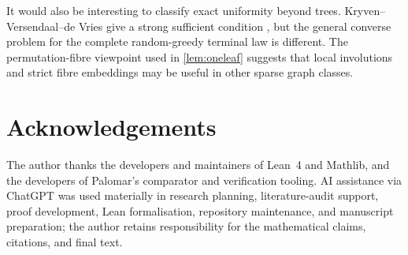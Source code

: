 \documentclass[11pt]{article}
\theoremstyle{definition}
\begin{document}
It would also be interesting to classify exact uniformity beyond trees.  Kryven--Versendaal--de Vries give a strong sufficient condition \cite{KryvenEtAl2026}, but the general converse problem for the complete random-greedy terminal law is different.  The permutation-fibre viewpoint used in \cref{lem:oneleaf} suggests that local involutions and strict fibre embeddings may be useful in other sparse graph classes.

\section*{Acknowledgements}

The author thanks the developers and maintainers of Lean~4 and Mathlib, and the developers of Palomar's comparator and verification tooling.  AI assistance via ChatGPT was used materially in research planning, literature-audit support, proof development, Lean formalisation, repository maintenance, and manuscript preparation; the author retains responsibility for the mathematical claims, citations, and final text.



\end{document}
